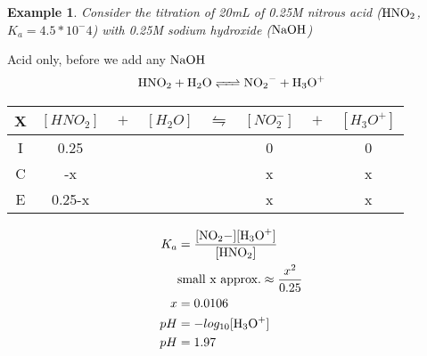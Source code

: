 \documentclass[../CHEM152Notes.tex]{subfiles}
\newtheorem{exmp}{Example}
\begin{document}
\begin{exmp}
    Consider the titration of 20mL of 0.25M nitrous acid ($\ce{HNO2}$, $K_a = 4.5*10^-4$) with 0.25M sodium hydroxide ($\ce{NaOH}$)
\end{exmp}
Acid only, before we add any $\ce{NaOH}$
\begin{equation*}
    \begin{aligned}
        \ce{HNO2 + H2O <=> NO2- + H3O+}
    \end{aligned}
\end{equation*}
\newline
\begin{tabular}{c|c@{}c@{}c@{}c@{}c@{}c@{}c}
    \hline
    X   & $[HNO_2]$ & ${}+{}$ & $[H_2O]$ & ${}\leftrightharpoons{}$ & $[NO_2^-]$ & ${}+{}$ & $[H_3O^+]$ \\
    \hline
    I   &  0.25   &&     &&  0   && 0  \\
    C   &  -x  &&     &&  x  && x \\
    E   & 0.25-x &&     &&  x  && x \\      
\end{tabular}
\newline
\begin{equation*}
    \begin{aligned}
        K_a &= \ce{\frac{[NO2-][H3O+]}{[HNO2]}} \\
            &\text{small x approx.} \approx \frac{x^2}{0.25} \\
          x &= 0.0106 \\
        pH &= -log_{10}\ce{[H3O+]} \\
        pH &= 1.97
    \end{aligned}
\end{equation*}
\end{document}

